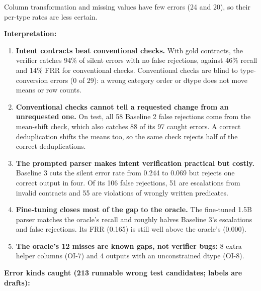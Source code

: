 \documentclass[11pt]{article}
\providecommand{\tightlist}{\setlength{\itemsep}{0pt}\setlength{\parskip}{0pt}}
\begin{document}
Column transformation and missing values have few errors (24 and 20), so
their per-type rates are less certain.

\textbf{Interpretation:}

\begin{enumerate}
\def\labelenumi{\arabic{enumi}.}
\tightlist
\item
  \textbf{Intent contracts beat conventional checks.} With gold
  contracts, the verifier catches 94\% of silent errors with no false
  rejections, against 46\% recall and 14\% FRR for conventional checks.
  Conventional checks are blind to type-conversion errors (0 of 29): a
  wrong category order or dtype does not move means or row counts.
\item
  \textbf{Conventional checks cannot tell a requested change from an
  unrequested one.} On test, all 58 Baseline 2 false rejections come
  from the mean-shift check, which also catches 88 of its 97 caught
  errors. A correct deduplication shifts the means too, so the same
  check rejects half of the correct deduplications.
\item
  \textbf{The prompted parser makes intent verification practical but
  costly.} Baseline 3 cuts the silent error rate from 0.244 to 0.069 but
  rejects one correct output in four. Of its 106 false rejections, 51
  are escalations from invalid contracts and 55 are violations of
  wrongly written predicates.
\item
  \textbf{Fine-tuning closes most of the gap to the oracle.} The
  fine-tuned 1.5B parser matches the oracle's recall and roughly halves
  Baseline 3's escalations and false rejections. Its FRR (0.165) is
  still well above the oracle's (0.000).
\item
  \textbf{The oracle's 12 misses are known gaps, not verifier bugs:} 8
  extra helper columns (OI-7) and 4 outputs with an unconstrained dtype
  (OI-8).
\end{enumerate}

\textbf{Error kinds caught (213 runnable wrong test candidates; labels
are drafts):}
\end{document}
